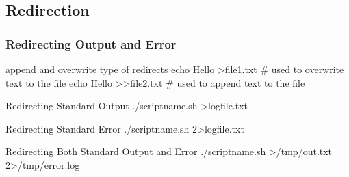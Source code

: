 \documentclass{beamer}
\begin{document}
\subsection{ Redirection }
\begin{frame}\frametitle{ Redirecting Output and Error }

\begin{block}{ append and overwrite type of redirects }
echo Hello \textgreater file1.txt   \# used to overwrite text to the file\newline
echo Hello \textgreater\textgreater file2.txt \# used to append text to the file
\end{block}
\pause
\begin{block}{ Redirecting Standard Output }
./scriptname.sh \textgreater logfile.txt
\end{block}
\pause
\begin{block}{ Redirecting Standard Error }
./scriptname.sh 2\textgreater logfile.txt
\end{block}
\pause
\begin{block}{ Redirecting Both Standard Output and Error }
./scriptname.sh \textgreater/tmp/out.txt 2\textgreater/tmp/error.log
\end{block}

\end{frame}


\end{document}
